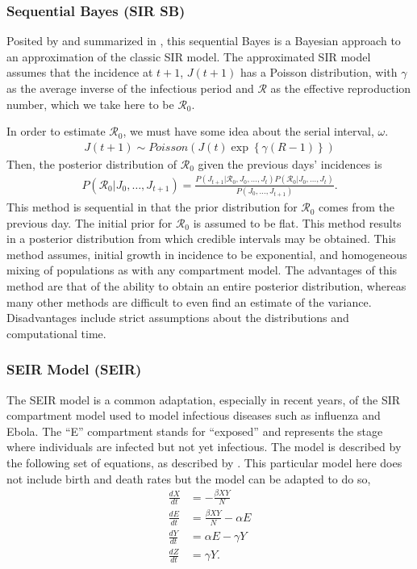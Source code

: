 \documentclass[12pt]{article}
\newcommand{\rr}{\ensuremath{\mathcal{R}_0}}
\begin{document}
\subsubsection{Sequential Bayes (SIR SB)}\label{sec:seqbayes}

Posited by \cite{bettencourt2008} and summarized in \cite{obadia2012r0}, this sequential Bayes is a Bayesian approach to an approximation of the classic SIR model.  The approximated SIR model assumes that the incidence at $t+1$, $J(t+1)$ has a Poisson distribution, with $\gamma$ as the  average inverse of the infectious period and $\mathcal{R}$ as the effective reproduction number, which we take here to be $\rr$.

In order to estimate $\rr$, we must have some idea about the serial interval, $\omega$.
\begin{align*}
J(t+1)  \sim Poisson( J(t) \exp \left \{  \gamma (R-1)\right \})
\end{align*}
Then, the posterior distribution of $\rr$ given the previous days' incidences is
\begin{align*}
  P(\rr | J_0, \dots, J_{t+1}) = \frac{P(J_{t+1} | \rr, J_0, \dots, J_t)P(\rr| J_0, \dots, J_t)}{P(J_0, \dots, J_{t+1})}.
\end{align*}
This method is sequential in that the prior distribution for $\rr$ comes from the previous day.  The initial prior for $\rr$ is assumed to be flat.  This method results in a posterior distribution from which credible intervals may be obtained.  This method assumes, initial growth in incidence to be exponential, and homogeneous mixing of populations as with any compartment model.  The advantages of this method are that of the ability to obtain an entire posterior distribution, whereas many other methods are difficult to even find an estimate of the variance.  Disadvantages include strict assumptions about the distributions and computational time.




\subsubsection{SEIR Model (SEIR)}
\label{sec:seir-model}

The SEIR model is a common adaptation, especially in recent years, of the SIR compartment model used to model infectious diseases such as influenza and Ebola\citep{mills2004,althaus2014}.  The ``E'' compartment stands for ``exposed'' and represents the stage where individuals are infected but not yet infectious.  The model is described by the following set of equations, as described by \cite{cintronarias2009}.  This particular model here does not include birth and death rates but the model can be adapted to do so,
\begin{align*}
  \frac{dX}{dt} &= - \frac{\beta XY}{N} \\
  \frac{dE}{dt} &= \frac{\beta XY}{N}  - \alpha E\\
  \frac{dY}{dt} &= \alpha E - \gamma Y \\
  \frac{dZ}{dt} &= \gamma Y.
\end{align*}
\end{document}
